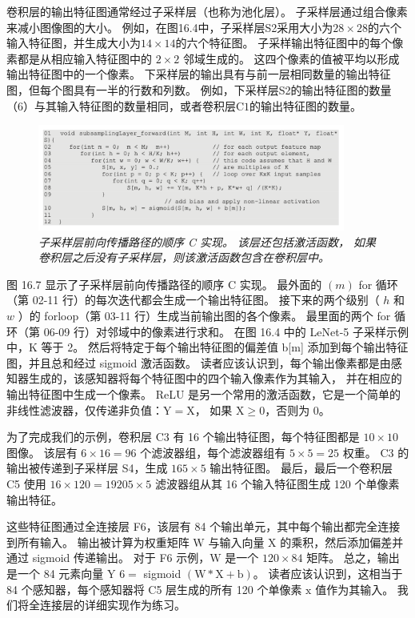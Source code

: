 卷积层的输出特征图通常经过子采样层（也称为池化层）。 子采样层通过组合像素来减小图像图的大小。 
例如，在图16.4中，子采样层S2采用大小为$28×28$的六个输入特征图，并生成大小为$14×14$的六个特征图。 
子采样输出特征图中的每个像素都是从相应输入特征图中的 $2 \times 2$ 邻域生成的。 
这四个像素的值被平均以形成输出特征图中的一个像素。 
下采样层的输出具有与前一层相同数量的输出特征图，但每个图具有一半的行数和列数。 
例如，下采样层S2的输出特征图的数量（6）与其输入特征图的数量相同，或者卷积层$\mathrm{C} 1$的输出特征图的数量。

\begin{figure}[H]
	\centering
	\includegraphics[width=0.9\textwidth]{figs/F16.7.png}
	\caption{\textit{子采样层前向传播路径的顺序 C 实现。 该层还包括激活函数，
	如果卷积层之后没有子采样层，则该激活函数包含在卷积层中。}}
\end{figure}

图 16.7 显示了子采样层前向传播路径的顺序 $\mathrm{C}$ 实现。 
最外面的 $(m)$ for 循环（第 02-11 行）的每次迭代都会生成一个输出特征图。 
接下来的两个级别（ $h$ 和 $w$ ）的 forloop（第 03-11 行）生成当前输出图的各个像素。 
最里面的两个 for 循环（第 06-09 行）对邻域中的像素进行求和。 
在图 16.4 中的 LeNet-5 子采样示例中，$\mathrm{K}$ 等于 2。 
然后将特定于每个输出特征图的偏差值 b[m] 添加到每个输出特征图，并且总和经过 sigmoid 激活函数。 
读者应该认识到，每个输出像素都是由感知器生成的，该感知器将每个特征图中的四个输入像素作为其输入，
并在相应的输出特征图中生成一个像素。 
ReLU 是另一个常用的激活函数，它是一个简单的非线性滤波器，仅传递非负值：$\mathrm{Y}=\mathrm{X}$，
如果 $\mathrm{X} \geq 0$，否则为 0。

为了完成我们的示例，卷积层 C3 有 16 个输出特征图，每个特征图都是 $10 × 10$ 图像。 
该层有 $6 \times 16=96$ 个滤波器组，每个滤波器组有 $5 \times 5=25$ 权重。 
$\mathrm{C} 3$ 的输出被传递到子采样层 S4，生成 $165 \times 5$ 输出特征图。 
最后，最后一个卷积层 C5 使用 $16 × 120=19205 \times 5$ 滤波器组从其 16 个输入特征图生成 120 个单像素输出特征。

这些特征图通过全连接层 F6，该层有 84 个输出单元，其中每个输出都完全连接到所有输入。 
输出被计算为权重矩阵 $\mathrm{W}$ 与输入向量 $\mathrm{X}$ 的乘积，然后添加偏差并通过 sigmoid 传递输出。 
对于 F6 示例，$\mathrm{W}$ 是一个 $120 \times 84$ 矩阵。 
总之，输出是一个 84 元素向量 Y $6=$ sigmoid $(\mathrm{W} * \mathrm{X}+\mathrm{b})$。 
读者应该认识到，这相当于 84 个感知器，每个感知器将 C5 层生成的所有 120 个单像素 $\mathrm{x}$ 值作为其输入。 
我们将全连接层的详细实现作为练习。


